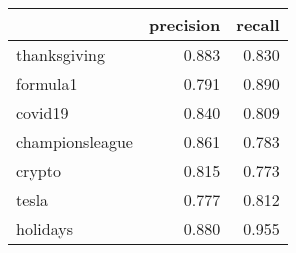 \begin{tabular}{lrr}
\toprule
{} &  precision &  recall \\
\midrule
thanksgiving    &      0.883 &   0.830 \\
formula1        &      0.791 &   0.890 \\
covid19         &      0.840 &   0.809 \\
championsleague &      0.861 &   0.783 \\
crypto          &      0.815 &   0.773 \\
tesla           &      0.777 &   0.812 \\
holidays        &      0.880 &   0.955 \\
\bottomrule
\end{tabular}
